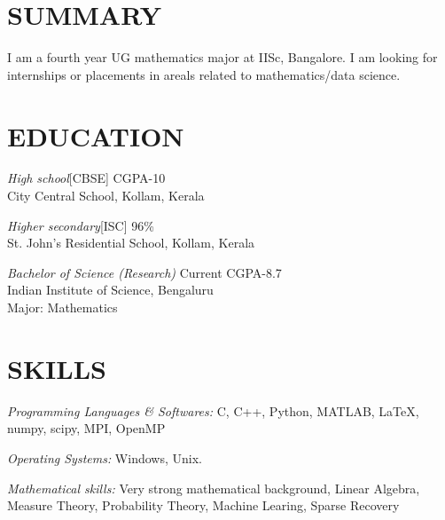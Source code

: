 \documentclass[margin, 10pt]{res} %
\begin{document}
\begin{resume}

 
\section{SUMMARY}  

I am a fourth year UG mathematics major at IISc, Bangalore. I am looking for internships or placements in areals related to
mathematics/data science.


\section{EDUCATION}

{\sl High school}[CBSE] \hfill CGPA-10\\
City Central School, Kollam, Kerala 

{\sl Higher secondary}[ISC]  \hfill  96\%\\
St. John's Residential School, Kollam, Kerala

{\sl Bachelor of Science (Research)} \hfill Current CGPA-8.7\\
Indian Institute of Science, Bengaluru\\
Major: Mathematics\\
 

\section{SKILLS} 

{\sl Programming Languages \& Softwares:} 
C, C++, Python, MATLAB, \LaTeX, numpy, scipy, MPI, OpenMP 

{\sl Operating Systems:} Windows, Unix.

{\sl Mathematical skills:} Very strong mathematical background, Linear Algebra,
Measure Theory, Probability Theory, Machine Learing, Sparse Recovery


\end{resume}
\end{document}

